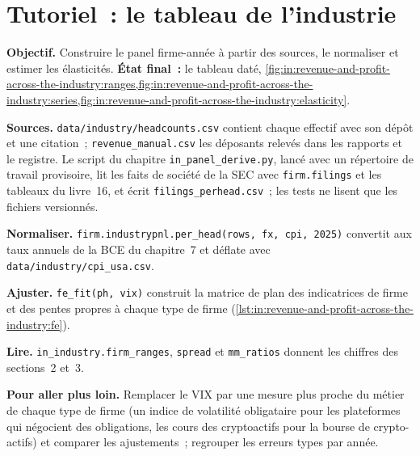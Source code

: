\section{Tutoriel~: le tableau de l'industrie}\label{tut:in:revenue-and-profit-across-the-industry:tut}

\begin{tutorial}
\textbf{Objectif.} Construire le panel firme-année à partir des sources, le normaliser et estimer les élasticités.
\textbf{État final~:} le tableau daté,
\cref{fig:in:revenue-and-profit-across-the-industry:ranges,fig:in:revenue-and-profit-across-the-industry:series,fig:in:revenue-and-profit-across-the-industry:elasticity}.
\begin{tutsteps}
\item \textbf{Sources.} \texttt{data/industry/headcounts.csv} contient chaque effectif avec son dépôt et une citation~;
\texttt{revenue\_manual.csv} les déposants relevés dans les rapports et le registre. Le script du chapitre
\texttt{in\_panel\_derive.py}, lancé avec un répertoire de travail provisoire, lit les faits de société de la SEC avec \texttt{firm.filings} et
les tableaux du livre~16, et écrit \texttt{filings\_perhead.csv}~; les tests ne lisent que les fichiers versionnés.
\item \textbf{Normaliser.} \texttt{firm.industrypnl.per\_head(rows, fx, cpi, 2025)} convertit aux taux annuels de la BCE du
chapitre~7 et déflate avec \texttt{data/industry/cpi\_usa.csv}.
\item \textbf{Ajuster.} \texttt{fe\_fit(ph, vix)} construit la matrice de plan des indicatrices de firme et des pentes propres à chaque type de firme
(\cref{lst:in:revenue-and-profit-across-the-industry:fe}).
\label{lst:in:revenue-and-profit-across-the-industry:fe}
\item \textbf{Lire.} \texttt{in\_industry.firm\_ranges}, \texttt{spread} et \texttt{mm\_ratios} donnent les chiffres des
sections~2 et~3.
\end{tutsteps}
\end{tutorial}

\textbf{Pour aller plus loin.} Remplacer le VIX par une mesure plus proche du métier de chaque type de firme (un indice de volatilité obligataire pour les plateformes
qui négocient des obligations, les cours des cryptoactifs pour la bourse de crypto-actifs) et comparer les ajustements~; regrouper les erreurs types
par année.

